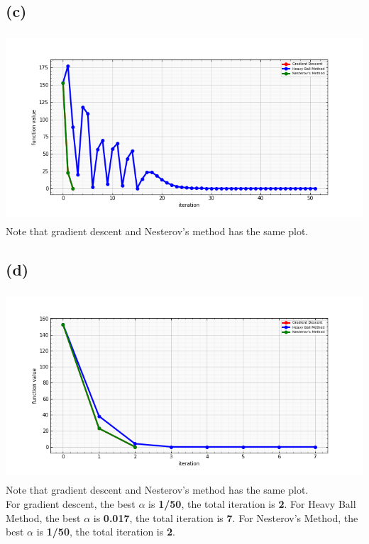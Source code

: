 \documentclass[12pt, a4 paper]{article}
\begin{document}
\begin{framed}
        \subsection{(c)}
        {\centering
        \includegraphics[width=14cm, height=7cm]{3c.png}
        }
        Note that gradient descent and Nesterov's method has 
        the same plot.

        \subsection{(d)}
        {\centering
        \includegraphics[width=14cm, height=7cm]{3d.png}
        }
        Note that gradient descent and Nesterov's method has 
        the same plot.\\
        \indent For gradient descent, the best $\alpha$ is \textbf{1/50},
        the total iteration is \textbf{2}.
        For Heavy Ball Method, the best $\alpha$ is \textbf{0.017},
        the total iteration is \textbf{7}.
        For Nesterov's Method, the best $\alpha$ is \textbf{1/50},
        the total iteration is \textbf{2}.

    \end{framed}
\end{document}
